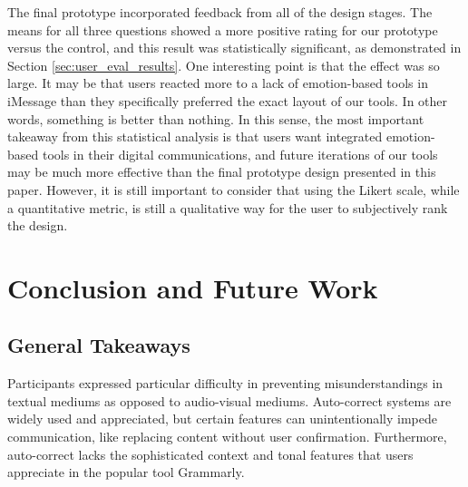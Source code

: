 \documentclass[acmsmall,screen,authorversion,nonacm]{acmart}
\begin{document}
The final prototype incorporated feedback from all of the design stages. The means for all three questions showed a more positive rating for our prototype versus the control, and this result was statistically significant, as demonstrated in Section \ref{sec:user_eval_results}. One interesting point is that the effect was so large. It may be that users reacted more to a lack of emotion-based tools in iMessage than they specifically preferred the exact layout of our tools. In other words, something is better than nothing. In this sense, the most important takeaway from this statistical analysis is that users want integrated emotion-based tools in their digital communications, and future iterations of our tools may be much more effective than the final prototype design presented in this paper. However, it is still important to consider that using the Likert scale, while a quantitative metric, is still a qualitative way for the user to subjectively rank the design.

\section{Conclusion and Future Work}
\label{sec:conclusion}

\subsection{General Takeaways}

Participants expressed particular difficulty in preventing misunderstandings in textual mediums as opposed to audio-visual mediums. Auto-correct systems are widely used and appreciated, but certain features can unintentionally impede communication, like replacing content without user confirmation. Furthermore, auto-correct lacks the sophisticated context and tonal features that users appreciate in the popular tool Grammarly.
\end{document}
